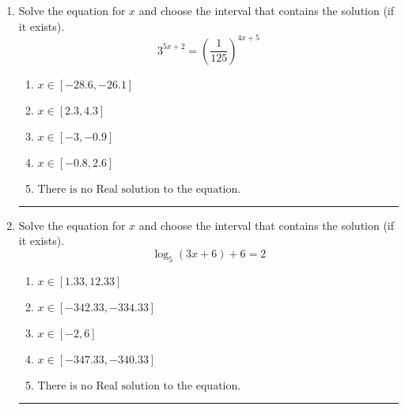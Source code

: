 \documentclass[14pt]{extbook}
\newcommand{\litem}[1]{\item#1\hspace*{-1cm}\rule{\textwidth}{0.4pt}}
\begin{document}
\begin{enumerate}
{\begin{enumerate}[label=\Alph*.]
\end{enumerate} }
\litem{
Solve the equation for $x$ and choose the interval that contains the solution (if it exists).\[ 3^{5x+2} = \left(\frac{1}{125}\right)^{4x+5} \]\begin{enumerate}[label=\Alph*.]
\item \( x \in [-28.6, -26.1] \)
\item \( x \in [2.3, 4.3] \)
\item \( x \in [-3, -0.9] \)
\item \( x \in [-0.8, 2.6] \)
\item \( \text{There is no Real solution to the equation.} \)

\end{enumerate} }
\litem{
Solve the equation for $x$ and choose the interval that contains the solution (if it exists).\[ \log_{5}{(3x+6)}+6 = 2 \]\begin{enumerate}[label=\Alph*.]
\item \( x \in [1.33, 12.33] \)
\item \( x \in [-342.33, -334.33] \)
\item \( x \in [-2, 6] \)
\item \( x \in [-347.33, -340.33] \)
\item \( \text{There is no Real solution to the equation.} \)

\end{enumerate} }
\end{enumerate}
\end{document}
